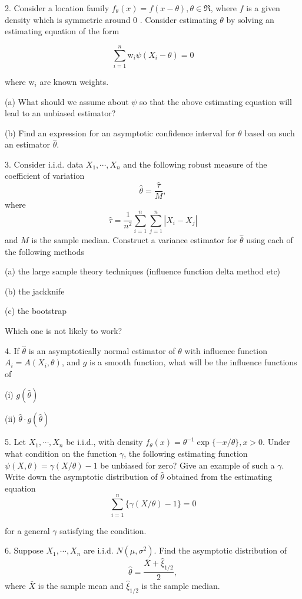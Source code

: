 \documentclass[11pt]{article}
\theoremstyle{definition}
\begin{document}
2. Consider a location family $f_\theta(x)=f(x-\theta), \theta \in \Re$, where $f$ is a given density which is symmetric around 0 . Consider estimating $\theta$ by solving an estimating equation of the form

$$
\sum_{i=1}^n \mathrm{w}_i \psi\left(X_i-\theta\right)=0
$$

where $\mathrm{w}_i$ are known weights.

(a) What should we assume about $\psi$ so that the above estimating equation will lead to an unbiased estimator? 

(b) Find an expression for an asymptotic confidence interval for $\theta$ based on such an estimator $\widehat{\theta}$.

3. Consider i.i.d. data $X_1, \cdots, X_n$ and the following robust measure of the coefficient of variation
$$
\widehat{\theta}=\frac{\widehat{\tau}}{M},
$$
where
$$
\widehat{\tau}=\frac{1}{n^2} \sum_{i=1}^n \sum_{j=1}^n\left|X_i-X_j\right|
$$
and $M$ is the sample median.
Construct a variance estimator for $\widehat{\theta}$ using each of the following methods

(a) the large sample theory techniques (influence function delta method etc)

(b) the jackknife

(c) the bootstrap

Which one is not likely to work?

4. If $\widehat{\theta}$ is an asymptotically normal estimator of $\theta$ with influence function $A_i= A\left(X_i, \theta\right)$, and $g$ is a smooth function, what will be the influence functions of 

(i) $g(\widehat{\theta})$ 

(ii) $\widehat{\theta} \cdot g(\widehat{\theta})$

5. Let $X_1, \cdots, X_n$ be i.i.d., with density $f_\theta(x)=\theta^{-1} \exp \{-x / \theta\}, x>0$. Under what condition on the function $\gamma$, the following estimating function $\psi(X, \theta)=\gamma(X / \theta)-1$ be unbiased for zero? Give an example of such a $\gamma$. Write down the asymptotic distribution of $\widehat{\theta}$ obtained from the estimating equation
$$
\sum_{i=1}^n\{\gamma(X / \theta)-1\}=0
$$

for a general $\gamma$ satisfying the condition.

6. Suppose $X_1, \cdots, X_n$ are i.i.d. $N\left(\mu, \sigma^2\right)$. Find the asymptotic distribution of
$$
\widehat{\theta}=\frac{\bar{X}+\widehat{\xi}_{1 / 2}}{2},
$$
where $\bar{X}$ is the sample mean and $\widehat{\xi}_{1 / 2}$ is the sample median.
\end{document}
